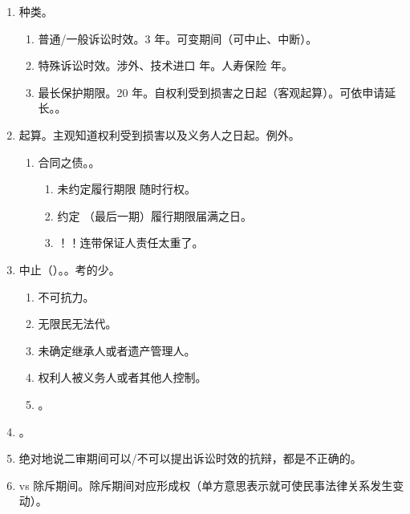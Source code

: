 \begin{enumerate}
\begin{enumerate}
          \item 抗辩权发生说。义务人取得拒绝履行的抗辩权（诉讼时效抗辩权）。
        \end{enumerate}
  \item 种类。
        \begin{enumerate}
          \item 普通/一般诉讼时效。3 年。可变期间（可中止、中断）。
          \item 特殊诉讼时效。涉外、技术进口  年。人寿保险  年。
          \item 最长保护期限。20 年。自权利受到损害之日起（客观起算）。可依申请延长。。
        \end{enumerate}
  \item 起算。主观知道权利受到损害以及义务人之日起。例外。
        \begin{enumerate}
          \item 合同之债。。
                \begin{enumerate}
                  \item 未约定履行期限 \yjt 随时行权。
                  \item 约定 \yjt（最后一期）履行期限届满之日。
                  \item {}！！连带保证人责任太重了。
                \end{enumerate}
        \end{enumerate}
  \item 中止（）。。考的少。
        \begin{enumerate}
          \item 不可抗力。
          \item 无限民无法代。
          \item 未确定继承人或者遗产管理人。
          \item 权利人被义务人或者其他人控制。
          \item {}。
        \end{enumerate}
  \item {}。
  \item 绝对地说二审期间可以/不可以提出诉讼时效的抗辩，都是不正确的。
  \item vs 除斥期间。除斥期间对应形成权（单方意思表示就可使民事法律关系发生变动）。
        \begin{enumerate}

\end{enumerate}
\end{enumerate}
